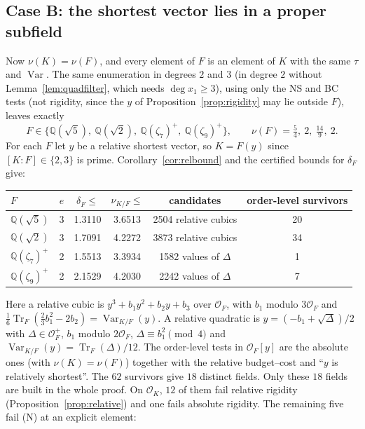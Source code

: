 \documentclass[11pt]{amsart}
\theoremstyle{definition}
\DeclareMathOperator{\Tr}{Tr}
\DeclareMathOperator{\Var}{Var}
\newcommand{\OK}{\mathcal{O}_K}
\newcommand{\OF}{\mathcal{O}_F}
\newcommand{\Q}{\mathbb{Q}}
\newcommand{\nurel}{\nu_{K/F}}
\begin{document}
\subsection{Case B: the shortest vector lies in a proper subfield}\label{sec:caseB}
Now $\nu(K)=\nu(F)$, and every element of $F$ is an element of $K$ with the same $\tau$ and
$\Var$.  The same enumeration in degrees $2$ and $3$ (in degree $2$ without
Lemma~\ref{lem:quadfilter}, which needs $\deg x_1\ge3$), using only the NS and BC tests (not
rigidity, since the $y$ of Proposition~\ref{prop:rigidity} may lie outside $F$), leaves
exactly
\[
F\in\{\Q(\sqrt5),\ \Q(\sqrt2),\ \Q(\zeta_7)^+,\ \Q(\zeta_9)^+\},
\qquad \nu(F)=\tfrac54,\ 2,\ \tfrac{14}9,\ 2 .
\]
For each $F$ let $y$ be a relative shortest vector, so $K=F(y)$ since $[K:F]\in\{2,3\}$ is
prime.  Corollary~\ref{cor:relbound} and the certified bounds for $\delta_F$ give:

\begin{center}
\begin{tabular}{lccccc}
\toprule
$F$ & $e$ & $\delta_F\le$ & $\nurel\le$ & candidates & order-level survivors\\
\midrule
$\Q(\sqrt5)$ & 3 & 1.3110 & 3.6513 & 2504 relative cubics & 20\\
$\Q(\sqrt2)$ & 3 & 1.7091 & 4.2272 & 3873 relative cubics & 34\\
$\Q(\zeta_7)^+$ & 2 & 1.5513 & 3.3934 & 1582 values of $\Delta$ & 1\\
$\Q(\zeta_9)^+$ & 2 & 2.1529 & 4.2030 & 2242 values of $\Delta$ & 7\\
\bottomrule
\end{tabular}
\end{center}

Here a relative cubic is $y^3+b_1y^2+b_2y+b_3$ over $\OF$, with $b_1$ modulo $3\OF$ and
$\frac16\Tr_F(\frac23b_1^2-2b_2)=\Var_{K/F}(y)$.  A relative quadratic is
$y=(-b_1+\sqrt\Delta)/2$ with $\Delta\in\OF^+$, $b_1$ modulo $2\OF$, $\Delta\equiv b_1^2\pmod4$ and
$\Var_{K/F}(y)=\Tr_F(\Delta)/12$.  The order-level tests in $\OF[y]$ are the absolute ones
(with $\nu(K)=\nu(F)$) together with the relative budget--cost and ``$y$ is relatively
shortest''.  The $62$ survivors give $18$ distinct fields.  Only these $18$ fields are built
in the whole proof.  On $\OK$, $12$ of them fail relative rigidity
(Proposition~\ref{prop:relative}) and one fails absolute rigidity.  The remaining five fail
(N) at an explicit element:
\end{document}

